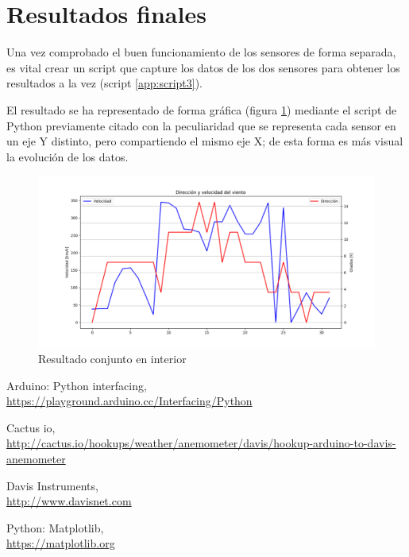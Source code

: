 \documentclass[a4paper, 11pt]{article}
\begin{document}
\section{Resultados finales}
Una vez comprobado el buen funcionamiento de los sensores de forma separada, es vital crear un script que capture los datos de los dos sensores para obtener los resultados a la vez (script \ref{app:script3}). 

El resultado se ha representado de forma gráfica  (figura \ref{fig:testfull}) mediante el script de Python previamente citado con la peculiaridad que se representa cada sensor en un eje Y distinto, pero compartiendo el mismo eje X; de esta forma es más visual la evolución de los datos.

\begin{figure}[h]
	\center
	\includegraphics[width=1\textwidth]{img/testFullIn.png}
	\caption{Resultado conjunto en interior}
	\label{fig:testfull}
\end{figure}
\newpage

\begin{thebibliography}{9}
Arduino: Python interfacing,
\\\url{https://playground.arduino.cc/Interfacing/Python}

Cactus io,
\\\url{http://cactus.io/hookups/weather/anemometer/davis/hookup-arduino-to-davis-anemometer}

Davis Instruments,
\\\url{http://www.davisnet.com}

Python: Matplotlib,
\\\url{https://matplotlib.org}
\end{thebibliography}
\newpage
\end{document}
